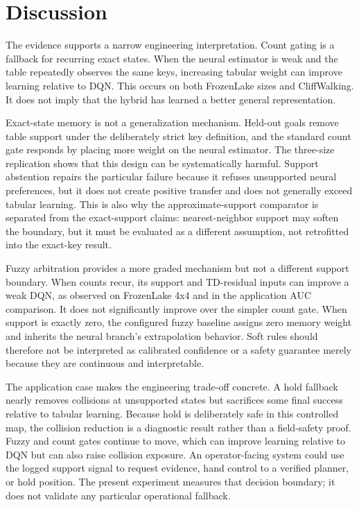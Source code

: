 \documentclass[preprint,12pt]{elsarticle}
\begin{document}
\section{Discussion}
\label{sec:discussion}

The evidence supports a narrow engineering interpretation. Count gating is a
fallback for recurring exact states. When the neural estimator is weak and
the table repeatedly observes the same keys, increasing tabular weight can
improve learning relative to DQN. This occurs on both FrozenLake sizes and
CliffWalking. It does not imply that the hybrid has learned a better general
representation.

Exact-state memory is not a generalization mechanism. Held-out goals remove
table support under the deliberately strict key definition, and the standard
count gate responds by placing more weight on the neural estimator. The
three-size replication shows that this design can be systematically harmful.
Support abstention repairs the particular failure because it refuses unsupported
neural preferences, but it does not create positive transfer and does not
generally exceed tabular learning. This is also why the approximate-support
comparator is separated from the exact-support claims: nearest-neighbor support
may soften the boundary, but it must be evaluated as a different assumption,
not retrofitted into the exact-key result.

Fuzzy arbitration provides a more graded mechanism but not a different
support boundary. When counts recur, its support and TD-residual inputs can
improve a weak DQN, as observed on FrozenLake 4x4 and in the application AUC
comparison. It does not significantly improve over the simpler count gate.
When support is exactly zero, the configured fuzzy baseline assigns zero
memory weight and inherits the neural branch's extrapolation behavior. Soft
rules should therefore not be interpreted as calibrated confidence or a
safety guarantee merely because they are continuous and interpretable.

The application case makes the engineering trade-off concrete. A hold fallback
nearly removes collisions at unsupported states but sacrifices some final
success relative to tabular learning. Because hold is deliberately safe in this
controlled map, the collision reduction is a diagnostic result rather than a
field-safety proof. Fuzzy and count gates continue to move, which can improve
learning relative to DQN but can also raise collision exposure. An
operator-facing system could use the logged support signal to request evidence,
hand control to a verified planner, or hold position. The present experiment
measures that decision boundary; it does not validate any particular
operational fallback.
\end{document}
